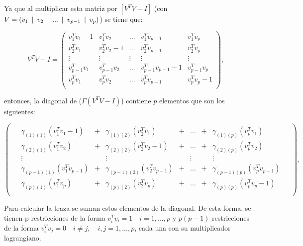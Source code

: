Ya que al multiplicar esta matriz por $[V^T V- I]$ (con $V = (v_1 \enskip |\enskip v_2 \enskip |\enskip ... \enskip |\enskip v_{p-1} \enskip |\enskip v_p)$) se tiene que: 

\begin{equation*}
V^T V - I = \left(\!
    \begin{array}{ccccc}
    v_1^T v_1 -1& v_1^T v_2 & \hdots & v_1^T v_{p-1} & v_1^T v_p \\
    v_2^T v_1 & v_2^T v_2 -1& \hdots & v_2^T v_{p-1} & v_2^T v_p \\
    \vdots & \vdots & \vdots & \vdots & \vdots \\
    v_{p-1}^T v_1 & v_{p-1}^T v_2 & \hdots & v_{p-1}^T v_{p-1} -1& v_{p-1}^Tv_p \\
    v_p^T v_1 & v_p^T v_2 & \hdots & v_p^Tv_{p-1} & v_{p}^Tv_{p} -1 \\
\end{array}
  \!\right), \quad
\end{equation*}

entonces, la diagonal de ($\Gamma (V^T V - I)$) contiene $p$ elementos que son los siguientes: 

\begin{equation*}
\left(\!
    \begin{array}{c}
    \begin{aligned}
    & \gamma_{(1)(1)}(v_1^T v_1 -1) &+& \gamma_{(1)(2)} (v_2^T v_1) &+& \hdots &+& \gamma_{(1)(p)}(v_p^T v_1) &\\
    & \gamma_{(2)(1)}(v_1^T v_2) &+& \gamma_{(2)(2)}(v_2^T v_2 -1)  &+& \hdots &+& \gamma_{(2)(p)}(v_p^T v_2) &\\
    & \vdots && \vdots && \vdots && \vdots &\\
    &\gamma_{(p-1)(1)}(v_1^T v_{p-1}) &+& \gamma_{(p-1)(2)} (v_2^T v_{p-1}) &+& \hdots &+& \gamma_{(p-1)(p)}(v_p^T v_{p-1})&\\
    &\gamma_{(p)(1)}(v_1^T v_{p}) &+& \gamma_{(p)(2)}(v_2^T v_p)  &+& \hdots &+& \gamma_{(p)(p)}(v_p^T v_{p}-1) &\\
\end{aligned}
\end{array}
  \!\right), \quad
\end{equation*}

Para calcular la traza se suman estos elementos de la diagonal. De esta forma, se tienen p restricciones de la forma $v_i^T v_i = 1 \quad i = 1,...,p$ y $p(p-1)$ restricciones de la 
forma $v_i^T v_j = 0 \quad i \neq j, \quad i,j = 1, ..., p$, cada una con su multiplicador lagrangiano.

